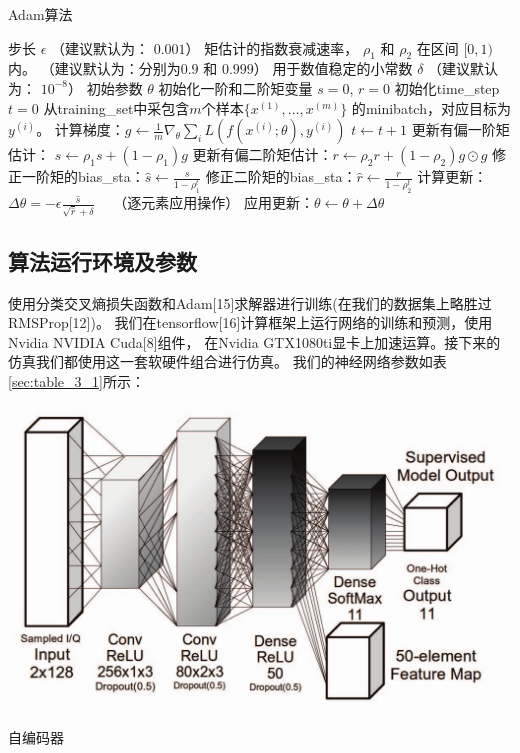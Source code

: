 \begin{algorithm}[ht]
	\caption{Adam算法}
	\label{alg:adam}
	\begin{algorithmic}
		\REQUIRE 步长 $\epsilon$ （建议默认为： $0.001$）
		\REQUIRE 矩估计的指数衰减速率， $\rho_1$ 和 $\rho_2$ 在区间 $[0, 1)$内。
		（建议默认为：分别为$0.9$ 和 $0.999$）
		\REQUIRE 用于数值稳定的小常数 $\delta$  （建议默认为： $10^{-8}$）
		\REQUIRE 初始参数 $\theta$
		\STATE 初始化一阶和二阶矩变量 $s = 0 $, $r = 0$
		\STATE 初始化\gls{time_step} $t=0$ 
		\STATE 从\gls{training_set}中采包含$m$个样本$\{ x^{(1)},\dots, x^{(m)}\}$ 的\gls{minibatch}，对应目标为$y^{(i)}$。
		\STATE 计算梯度：$g \leftarrow \frac{1}{m} \nabla_{\theta} \sum_i L(f(x^{(i)};\theta),y^{(i)})$ 
		\STATE $t \leftarrow t + 1$
		\STATE 更新有偏一阶矩估计： $s \leftarrow \rho_1 s + (1-\rho_1) g$
		\STATE 更新有偏二阶矩估计：$r \leftarrow \rho_2 r + (1-\rho_2)  g \odot g$
		\STATE 修正一阶矩的\gls{bias_sta}：$\hat{s} \leftarrow \frac{s}{1-\rho_1^t}$
		\STATE 修正二阶矩的\gls{bias_sta}：$\hat{r} \leftarrow \frac{r}{1-\rho_2^t}$
		\STATE 计算更新：$\Delta \theta = - \epsilon \frac{\hat{s}}{\sqrt{\hat{r}} + \delta}$ \ \  （逐元素应用操作）
		\STATE 应用更新：$\theta \leftarrow \theta + \Delta \theta$
		\ENDWHILE
	\end{algorithmic}
\end{algorithm}


\subsection{算法运行环境及参数}
使用分类交叉熵损失函数和Adam[15]求解器进行训练(在我们的数据集上略胜过RMSProp[12])。
我们在tensorflow[16]计算框架上运行网络的训练和预测，使用Nvidia NVIDIA Cuda[8]组件，
在Nvidia GTX1080ti显卡上加速运算。接下来的仿真我们都使用这一套软硬件组合进行仿真。
我们的神经网络参数如表\ref{sec:table_3_1}所示：\par
\begin{table}[!h]
	\centering
	\includegraphics[scale=0.3]{figures/chapter_3/cae_cnn_frame}
	\caption{自编码器}	\label{sec:table_3_1}
\end{table}

